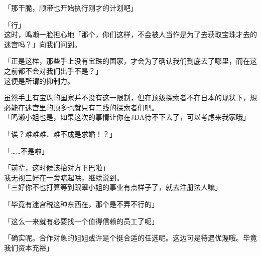 「那干脆，顺带也开始执行刚才的计划吧」

「行」\\

这时，鸣濑一脸担心地「那个，你们这样，不会被人当作是为了去获取宝珠才去的迷宫吗？」向我们问到。

「正是这样，那些手上没有宝珠的国家，才会为了确认我们到底去了哪里，而在这之前都不会对我们出手不是？」\\

这便是所谓的抑制力。

虽然手上有宝珠的国家并不没有这一限制，但在顶级探索者不在日本的现状下，想必能在迷宫里的顶多也就只有二线的探索者们吧。\\

「鸣濑小姐也是，如果这次的事情让你在JDA待不下去了，可以考虑来我家哦」

「诶？难难难、难不成是求婚！？」

「……不是啦」

「前辈，这时候该抬对方下巴啦」\\

我无视三好在一旁瞎起哄，继续说到。\\

「三好你不也打算等到跟翠小姐的事业有点样子了，就去注册法人嘛」

「毕竟有迷宫税这种东西在，那个是不弄不行的」

「这么一来就有必要找一个值得信赖的员工了呢」

「确实呢。合作对象的姐姐或许是个挺合适的任选呢。这边可是待遇优渥哦。毕竟我们资本充裕」

